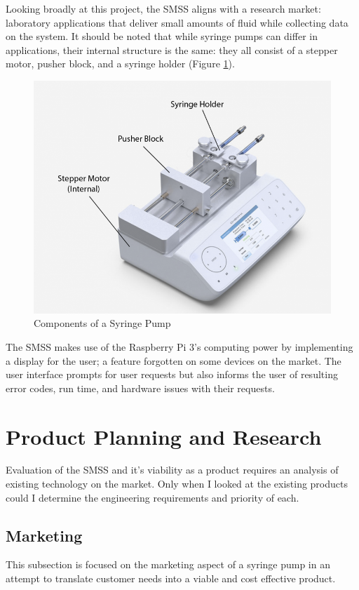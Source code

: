 \documentclass[journal]{IEEEtran}
\begin{document}
        Looking broadly at this project, the SMSS aligns with a research market: laboratory applications that deliver small amounts of fluid while collecting data on the system. It should be noted that while syringe pumps can differ in applications, their internal structure is the same: they all consist of a stepper motor, pusher block, and a syringe holder (Figure \ref{fig:Pump_example}). 
        
        \begin{figure}[H]
            \centering
            \includegraphics[scale=0.3]{Pump_example}
            \caption{Components of a Syringe Pump \cite{example-syringe}}
            \label{fig:Pump_example}
        \end{figure}

        The SMSS makes use of the Raspberry Pi 3's computing power by implementing a display for the user; a feature forgotten on some devices on the market. The user interface prompts for user requests but also informs the user of resulting error codes, run time, and hardware issues with their requests.

\section{Product Planning and Research} 
    Evaluation of the SMSS and it's viability as a product requires an analysis of existing technology on the market. Only when I looked at the existing products could I determine the engineering requirements and priority of each.
    
    \subsection{Marketing}
        This subsection is focused on the marketing aspect of a syringe pump in an attempt to translate customer needs into a viable and cost effective product.
        
\end{document}

